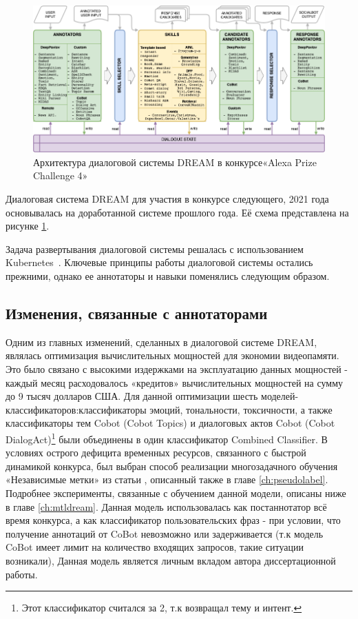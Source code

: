 \begin{figure}[ht]
  \includegraphics[width=\textwidth]{images/Alexa2_.png}
  \caption{Архитектура диалоговой системы {DREAM} в конкурсе«Alexa Prize Challenge 4»}\label{fig:Alexa2}
\end{figure}
Диалоговая система {DREAM} для участия в конкурсе следующего, 2021 года основывалась на доработанной системе прошлого года. Её схема представлена на рисунке \ref{fig:Alexa2}.


Задача развертывания диалоговой системы решалась с использованием Kubernetes~\cite{kubernetes}.
Ключевые принципы работы диалоговой системы остались прежними, однако ее аннотаторы и навыки поменялись следующим образом.

\subsection{Изменения, связанные с аннотаторами}\label{dream:2:ann}

Одним из главных изменений, сделанных в диалоговой системе DREAM, являлась оптимизация вычислительных мощностей для экономии видеопамяти. Это было связано с высокими издержками на эксплуатацию данных мощностей - каждый месяц расходовалось «кредитов» вычислительных мощностей на сумму до 9 тысяч долларов США. Для данной оптимизации шесть моделей-классификаторов:классификаторы эмоций, тональности, токсичности, а также классификаторы тем Cobot (Cobot Topics) и диалоговых актов Cobot (Cobot DialogAct)\footnote{Этот классификатор считался за 2, т.к возвращал тему и интент.} были объединены в один классификатор Combined Classifier. В условиях острого дефицита временных ресурсов, связанного с быстрой динамикой конкурса, был выбран способ реализации многозадачного обучения «Независимые метки» из статьи  \cite{pseudolabel}, описанный также в главе \ref{ch:pseudolabel}. Подробнее эксперименты, связанные с обучением данной модели, описаны ниже в главе \ref{ch:mtldream}. Данная модель использовалась как постаннотатор всё время конкурса, а как классификатор пользовательских фраз - при условии, что получение аннотаций от CoBot невозможно или задерживается (т.к модель CoBot имеет лимит на количество входящих запросов, такие ситуации возникали),  Данная модель является личным вкладом автора диссертационной работы.


